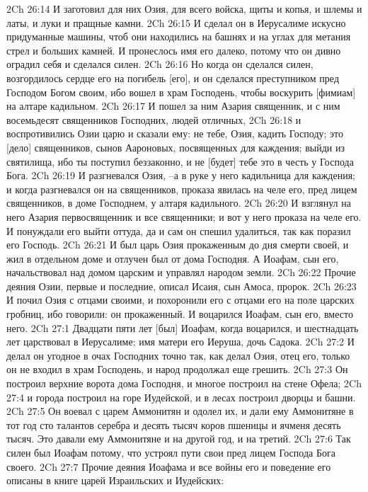 2Ch 26:14  И заготовил для них Озия, для всего войска, щиты и копья, и шлемы и латы, и луки и пращные камни.
2Ch 26:15  И сделал он в Иерусалиме искусно придуманные машины, чтоб они находились на башнях и на углах для метания стрел и больших камней. И пронеслось имя его далеко, потому что он дивно оградил себя и сделался силен.
2Ch 26:16  Но когда он сделался силен, возгордилось сердце его на погибель [его], и он сделался преступником пред Господом Богом своим, ибо вошел в храм Господень, чтобы воскурить [фимиам] на алтаре кадильном.
2Ch 26:17  И пошел за ним Азария священник, и с ним восемьдесят священников Господних, людей отличных,
2Ch 26:18  и воспротивились Озии царю и сказали ему: не тебе, Озия, кадить Господу; это [дело] священников, сынов Аароновых, посвященных для каждения; выйди из святилища, ибо ты поступил беззаконно, и не [будет] тебе это в честь у Господа Бога.
2Ch 26:19  И разгневался Озия, --а в руке у него кадильница для каждения; и когда разгневался он на священников, проказа явилась на челе его, пред лицем священников, в доме Господнем, у алтаря кадильного.
2Ch 26:20  И взглянул на него Азария первосвященник и все священники; и вот у него проказа на челе его. И понуждали его выйти оттуда, да и сам он спешил удалиться, так как поразил его Господь.
2Ch 26:21  И был царь Озия прокаженным до дня смерти своей, и жил в отдельном доме и отлучен был от дома Господня. А Иоафам, сын его, начальствовал над домом царским и управлял народом земли.
2Ch 26:22  Прочие деяния Озии, первые и последние, описал Исаия, сын Амоса, пророк.
2Ch 26:23  И почил Озия с отцами своими, и похоронили его с отцами его на поле царских гробниц, ибо говорили: он прокаженный. И воцарился Иоафам, сын его, вместо него.
2Ch 27:1  Двадцати пяти лет [был] Иоафам, когда воцарился, и шестнадцать лет царствовал в Иерусалиме; имя матери его Иеруша, дочь Садока.
2Ch 27:2  И делал он угодное в очах Господних точно так, как делал Озия, отец его, только он не входил в храм Господень, и народ продолжал еще грешить.
2Ch 27:3  Он построил верхние ворота дома Господня, и многое построил на стене Офела;
2Ch 27:4  и города построил на горе Иудейской, и в лесах построил дворцы и башни.
2Ch 27:5  Он воевал с царем Аммонитян и одолел их, и дали ему Аммонитяне в тот год сто талантов серебра и десять тысяч коров пшеницы и ячменя десять тысяч. Это давали ему Аммонитяне и на другой год, и на третий.
2Ch 27:6  Так силен был Иоафам потому, что устроял пути свои пред лицем Господа Бога своего.
2Ch 27:7  Прочие деяния Иоафама и все войны его и поведение его описаны в книге царей Израильских и Иудейских:
